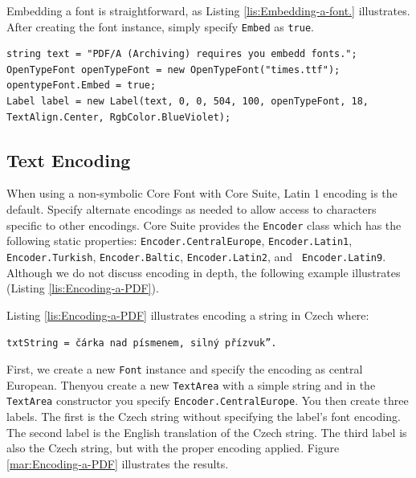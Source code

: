 \documentclass[american,letterpaper]{tufte-book}
\numberwithin{equation}{section}
\numberwithin{figure}{section}
\begin{document}
{Embedding a font is straightforward, as Listing \ref{lis:Embedding-a-font.}
illustrates. After creating the font instance, simply specify \texttt{Embed}
as \texttt{true}. 

\bgroup{}
\begin{lstlisting}[caption={Embedding a font.},label={lis:Embedding-a-font.},basicstyle={\small\ttfamily},breaklines=true]
string text = "PDF/A (Archiving) requires you embedd fonts.";
OpenTypeFont openTypeFont = new OpenTypeFont("times.ttf");
opentypeFont.Embed = true;
Label label = new Label(text, 0, 0, 504, 100, openTypeFont, 18, TextAlign.Center, RgbColor.BlueViolet);
\end{lstlisting}
\leavevmode\egroup


\subsection{Text Encoding}

When using a non-symbolic Core Font with Core Suite, Latin 1 encoding
is the default. Specify alternate encodings as needed to allow access
to characters specific to other encodings. Core Suite provides the
\texttt{Encoder} class which has the following static properties:
\texttt{Encoder.CentralEurope}, \texttt{Encoder.Latin1},
\texttt{Encoder.Turkish}, \texttt{Encoder.Baltic},
\texttt{Encoder.Latin2}, and  \texttt{ Encoder.Latin9}.
Although we do not discuss encoding in depth, the following example
illustrates (Listing \ref{lis:Encoding-a-PDF}).

Listing \ref{lis:Encoding-a-PDF} illustrates encoding a string in
Czech where:
\noindent\begin{flushleft}
\texttt{txtString = \textquotedbl čárka nad písmenem, silný
přízvuk''.} 
\par\end{flushleft}

First, we create a new \texttt{Font} instance and specify
the encoding as central European. Thenyou create a new \texttt{TextArea}
with a simple string and in the \texttt{TextArea} constructor
you specify \texttt{Encoder.CentralEurope}. You then create
three labels. The first is the Czech string without specifying the
label's font encoding. The second label is the English translation
of the Czech string. The third label is also the Czech string, but
with the proper encoding applied. Figure \ref{mar:Encoding-a-PDF}
illustrates the results. 

}
\end{document}
